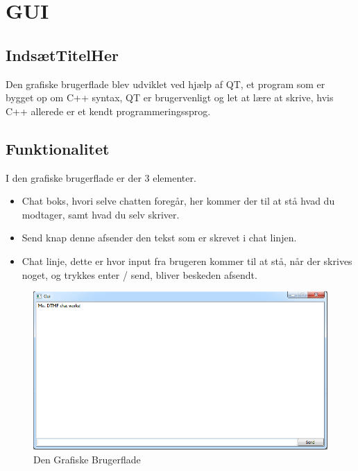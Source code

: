 \section{GUI}

\subsection{IndsætTitelHer}

Den grafiske brugerflade blev udviklet ved hjælp af QT, et program som er bygget op om C++ syntax, QT er brugervenligt og let at lære at skrive, hvis C++ allerede er et kendt programmeringssprog.\\
\subsection{Funktionalitet}

I den grafiske brugerflade er der 3 elementer.
\begin{itemize}
	\item Chat boks, hvori selve chatten foregår, her kommer der til at stå hvad du modtager, samt hvad du selv skriver.
	\item Send knap denne afsender den tekst som er skrevet i chat linjen.
	\item Chat linje, dette er hvor input fra brugeren kommer til at stå, når der skrives noget, og trykkes enter / send, bliver beskeden afsendt.
\end{itemize}

\begin{figure}[h]
\centering
\includegraphics[scale=0.5]{Billeder/GUI.PNG}
\caption{Den Grafiske Brugerflade}
\label{fig:tidsplan}
\end{figure}